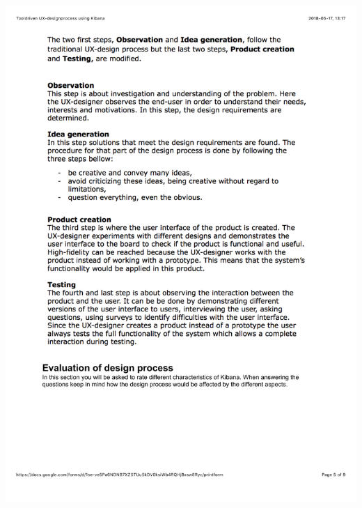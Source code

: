 \documentclass[12pt]{kththesis}
\begin{document}
\begin{appendices}
\includegraphics[width=1\textwidth]{UX_designprocess5.pdf}
\newpage

\end{appendices}
\end{document}
